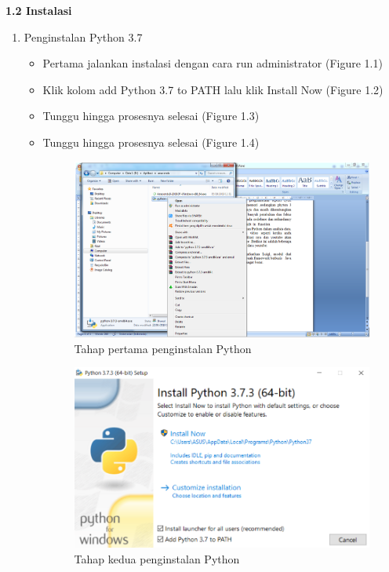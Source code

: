 \textbf{1.2 Instalasi}
\begin{enumerate}
\item Penginstalan Python 3.7

    \begin{itemize}
        \item Pertama jalankan instalasi dengan cara run administrator (Figure 1.1)
\item Klik kolom add Python 3.7 to PATH lalu klik Install Now (Figure 1.2)
\item Tunggu hingga prosesnya selesai (Figure 1.3)
\item Tunggu hingga prosesnya selesai (Figure 1.4)

    \begin{figure} [ht]
    \centering
    \includegraphics[scale=0.5]{figures/RA.PNG}
    \caption{Tahap pertama penginstalan Python}
\end{figure}

    \begin{figure} [ht]
    \centering
    \includegraphics[scale=0.5]{figures/SS1.png}
    \caption{Tahap kedua penginstalan Python}
\end{figure}


\end{itemize}
\end{enumerate}
